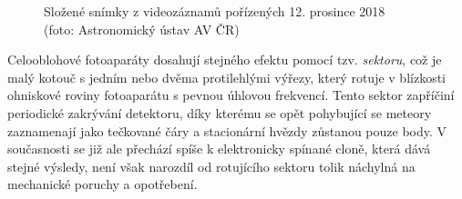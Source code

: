 \begin{figure}[p]
    \centering
    \caption[Složené snímky z videozáznamů]{
        Složené snímky z videozáznamů pořízených 12. prosince 2018\\
        {\small (foto: Astronomický ústav AV ČR)}
    }
    \label{img:observation:video-stitch}
\end{figure}

Celooblohové fotoaparáty dosahují stejného efektu pomocí tzv. \textit{sektoru}, což je malý kotouč s jedním nebo dvěma protilehlými výřezy, který rotuje v blízkosti ohniskové roviny fotoaparátu \cite{ceplecha} s pevnou úhlovou frekvencí. Tento sektor zapříčiní periodické zakrývání detektoru, díky kterému se opět pohybující se meteory zaznamenají jako tečkované čáry a stacionární hvězdy zůstanou pouze body. V současnosti se již ale přechází spíše k elektronicky spínané cloně, která dává stejné výsledy, není však narozdíl od rotujícího sektoru tolik náchylná na mechanické poruchy a opotřebení.

